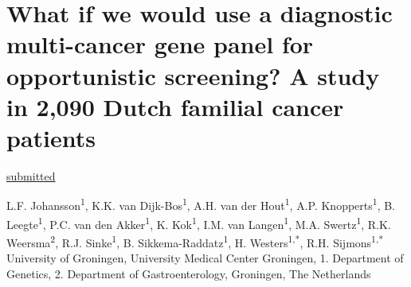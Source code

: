\chapter[Using a diagnostic gene panel for opportunistic screening]{What if we would use a diagnostic multi-cancer gene panel for opportunistic screening? A study in 2,090 Dutch familial cancer patients}
\label{chap:Opportunistic_screening}

{ \Large {} }

\hfill \underline{submitted} 


\newpage

\noindent
L.F. Johansson\textsuperscript{1}, K.K. van Dijk-Bos\textsuperscript{1}, A.H. van der Hout\textsuperscript{1}, A.P. Knopperts\textsuperscript{1}, B. Leegte\textsuperscript{1}, P.C. van den Akker\textsuperscript{1}, K. Kok\textsuperscript{1}, I.M. van Langen\textsuperscript{1}, M.A. Swertz\textsuperscript{1}, R.K. Weersma\textsuperscript{2}, R.J. Sinke\textsuperscript{1}, B. Sikkema-Raddatz\textsuperscript{1}, H. Westers\textsuperscript{1,*}, R.H. Sijmons\textsuperscript{1,*}\\


\noindent
University of Groningen, University Medical Center Groningen, 1. Department of Genetics, 2. Department of Gastroenterology, Groningen, The Netherlands\\

